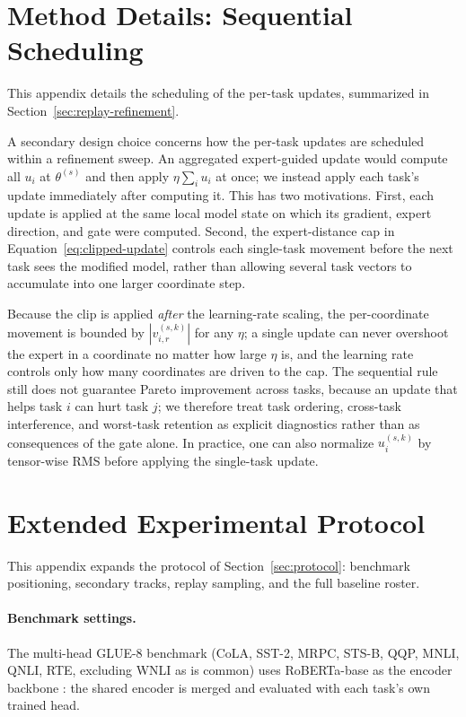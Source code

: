 \documentclass{article} %
\begin{document}
\section{Method Details: Sequential Scheduling}
\label{app:method}
This appendix details the scheduling of the per-task updates, summarized in Section~\ref{sec:replay-refinement}.

A secondary design choice concerns how the per-task updates are scheduled within a refinement sweep. An aggregated expert-guided update would compute all $u_i$ at $\theta^{(s)}$ and then apply $\eta\sum_i u_i$ at once; we instead apply each task's update immediately after computing it. This has two motivations. First, each update is applied at the same local model state on which its gradient, expert direction, and gate were computed. Second, the expert-distance cap in Equation~\eqref{eq:clipped-update} controls each single-task movement before the next task sees the modified model, rather than allowing several task vectors to accumulate into one larger coordinate step.

Because the clip is applied \emph{after} the learning-rate scaling, the per-coordinate movement is bounded by $|v_{i,r}^{(s,k)}|$ for any $\eta$; a single update can never overshoot the expert in a coordinate no matter how large $\eta$ is, and the learning rate controls only how many coordinates are driven to the cap. The sequential rule still does not guarantee Pareto improvement across tasks, because an update that helps task $i$ can hurt task $j$; we therefore treat task ordering, cross-task interference, and worst-task retention as explicit diagnostics rather than as consequences of the gate alone. In practice, one can also normalize $u_i^{(s,k)}$ by tensor-wise RMS before applying the single-task update.


\section{Extended Experimental Protocol}
\label{app:protocol}
This appendix expands the protocol of Section~\ref{sec:protocol}: benchmark positioning, secondary tracks, replay sampling, and the full baseline roster.

\paragraph{Benchmark settings.}
The multi-head GLUE-8 benchmark (CoLA, SST-2, MRPC, STS-B, QQP, MNLI, QNLI, RTE, excluding WNLI as is common) \citep{wang2018glue} uses RoBERTa-base as the encoder backbone \citep{liu2019roberta}: the shared encoder is merged and evaluated with each task's own trained head. 
\end{document}
